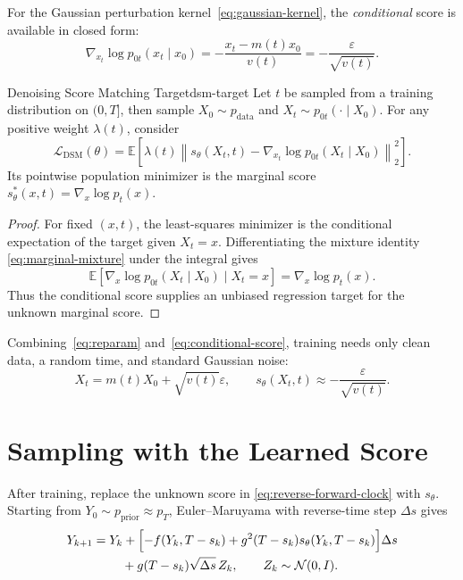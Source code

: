 \documentclass[11pt,a4paper]{article}
\newcommand{\E}{\mathbb{E}}
\newcommand{\cN}{\mathcal{N}}
\newcommand{\pdata}{p_{\mathrm{data}}}
\newcommand{\pprior}{p_{\mathrm{prior}}}
\begin{document}
For the Gaussian perturbation kernel~\eqref{eq:gaussian-kernel}, the
\emph{conditional} score is available in closed form:
\begin{equation}\label{eq:conditional-score}
  \nabla_{x_t}\log p_{0t}(x_t\mid x_0)
  =-\frac{x_t-m(t)x_0}{v(t)}
  =-\frac{\varepsilon}{\sqrt{v(t)}}.
\end{equation}

\begin{proposition}{Denoising Score Matching Target}{dsm-target}
Let $t$ be sampled from a training distribution on $(0,T]$, then sample
$X_0\sim\pdata$ and $X_t\sim p_{0t}(\cdot\mid X_0)$.  For any positive weight
$\lambda(t)$, consider
\begin{equation}\label{eq:dsm-loss}
  \mathcal{L}_{\mathrm{DSM}}(\theta)
  =\E\!\left[
    \lambda(t)
    \left\|
      s_\theta(X_t,t)
      -\nabla_{x_t}\log p_{0t}(X_t\mid X_0)
    \right\|_2^2
  \right].
\end{equation}
Its pointwise population minimizer is the marginal score
$s_{\theta}^{*}(x,t)=\nabla_x\log p_t(x)$.
\end{proposition}

\begin{proof}
For fixed $(x,t)$, the least-squares minimizer is the conditional expectation
of the target given $X_t=x$.  Differentiating the mixture identity
\eqref{eq:marginal-mixture} under the integral gives
\[
  \E\!\left[
    \nabla_x\log p_{0t}(X_t\mid X_0)
    \mid X_t=x
  \right]
  =\nabla_x\log p_t(x).
\]
Thus the conditional score supplies an unbiased regression target for the
unknown marginal score.
\end{proof}

Combining~\eqref{eq:reparam} and~\eqref{eq:conditional-score}, training needs
only clean data, a random time, and standard Gaussian noise:
\[
  X_t=m(t)X_0+\sqrt{v(t)}\varepsilon,
  \qquad
  s_\theta(X_t,t)\approx-\frac{\varepsilon}{\sqrt{v(t)}}.
\]

\section{Sampling with the Learned Score}\label{sec:sampling}

After training, replace the unknown score in
\eqref{eq:reverse-forward-clock} with $s_\theta$.  Starting from
$Y_0\sim\pprior\approx p_T$, Euler--Maruyama with reverse-time step $\Delta s$
gives
\begin{align}\label{eq:reverse-em}
  Y_{k+1}
  ={}&Y_k+\Bigl[-f(Y_k,T-s_k)
      +g^2(T-s_k)s_\theta(Y_k,T-s_k)\Bigr]\Delta s \\
     &\quad+g(T-s_k)\sqrt{\Delta s}\,Z_k,
  \qquad Z_k\sim\cN(0,I).
\end{align}
\end{document}
